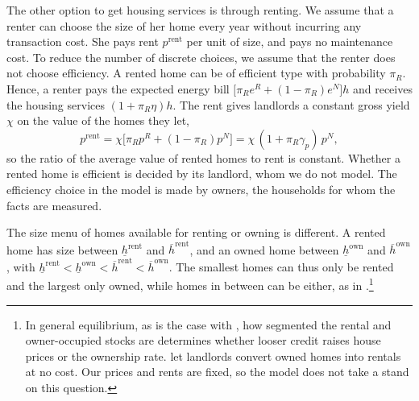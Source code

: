 The other option to get housing services is through renting. We assume that a renter can choose the size of her home
every year without incurring any transaction cost. She pays rent $p^{\mathrm{rent}}$ per unit of
size, and pays no maintenance cost. To reduce the number of discrete choices, we assume that the renter does not choose efficiency.  A rented home
can be of efficient type with probability $\pi_R$. Hence, a renter pays the expected energy
bill $\bigl[\pi_Re^R+(1-\pi_R)e^N\bigr]h$ and receives the housing services
$(1+\pi_R\eta)h$. The rent gives landlords a constant gross
yield $\chi$ on the value of the homes they let,
\begin{equation}
  p^{\mathrm{rent}}=\chi\bigl[\pi_Rp^R+(1-\pi_R)p^N\bigr]
  =\chi\,(1+\pi_R\gamma_p)\,p^N,
  \label{eq:rent}
\end{equation}
so the ratio of the average value of rented homes to rent is constant.  Whether a rented home is
efficient is decided by its landlord, whom we do not model.  The efficiency
choice in the model is made by owners, the households for whom the facts
are measured.


The size menu of homes available for renting or owning is different. A rented home has size
between $\underline h^{\mathrm{rent}}$ and $\overline h^{\mathrm{rent}}$,
and an owned home between $\underline h^{\mathrm{own}}$ and
$\overline h^{\mathrm{own}}$, with
$\underline h^{\mathrm{rent}}<\underline h^{\mathrm{own}}<\overline h^{\mathrm{rent}}<\overline h^{\mathrm{own}}$. The
smallest homes can thus only be rented and the largest only owned, while
homes in between can be either, as in \citet{kaplan2020housing}.\footnote{In general equilibrium, as is the case with \citet{kaplan2020housing}, how segmented the rental and
owner-occupied stocks are determines whether looser credit raises house
prices or the ownership rate. \citet{kaplan2020housing} let landlords
convert owned homes into rentals at no cost.  Our prices
and rents are fixed, so the model does not take a stand on this question.}




